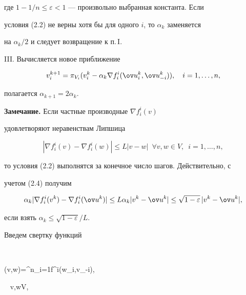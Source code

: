 где $1-1/n\le\varepsilon<1$ --- произвольно выбранная константа. Если 


условия (2.2) не верны хотя бы для одного $i$, то $\alpha_k$ заменяется 


на $\alpha_k/2$ и следует возвращение к п.\,I. 


 


III. Вычисляется новое приближение 


\begin{equation} 


v^{k+1}_i=\pi_{V_i}(v^k_i-\alpha_k\nabla f^i_i 


(\ov u{}^k_i,\ov u{}^k_{-i})),\quad i=1,\dotsc,n, 


\end{equation} 


полагается $\alpha_{k+1}=2\alpha_k$. 


\medskip 


 


{\bf Замечание.} Если частные производные $\nabla f^i_i(v)$ 


удовлетворяют неравенствам Липшица 


\begin{equation} 


|\nabla f^i_i(v)-\nabla f^i_i(w)|\le L|v-w| 


\ \; \forall v,w\in V,\ \;i=1,\dotsc,n, 


\end{equation} 


то условия (2.2) выполнятся за конечное число шагов. Действительно, с 


учетом (2.4) получим 


$$ 


\alpha_k|\nabla f^i_i(v^k)-\nabla f^i_i(\ov u{}^k)|\le 


L\alpha_k|v^k-\ov u{}^k|\le 


\sqrt{1-\varepsilon}\,|v^k-\ov u{}^k|, 


$$ 


если взять $\alpha_k\le\sqrt{1-\varepsilon}/L$. 


\medskip 


 


Введем свертку функций 


$$ 


\Phi(v,w)=\sum^n_{i=1}f^i(w_i,v_{-i}), 


\ \; v,w\in V, 


